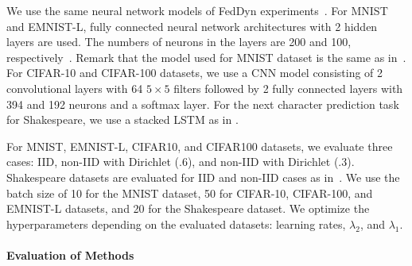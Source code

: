 \documentclass{article} %
\begin{document}
We use the same neural network models of FedDyn experiments~\citep{Acar2021federated}. For MNIST and EMNIST-L, fully connected neural network architectures with 2 hidden layers are used. The numbers of neurons in the layers are 200 and 100, respectively~\citep{Acar2021federated}. Remark that the model used for MNIST dataset is the same as in~\citet{Acar2021federated,McMahan2017communication}. For CIFAR-10 and CIFAR-100 datasets, we use a CNN model consisting of 2 convolutional layers with 64 $5 \times 5$ filters followed by 2 fully connected layers with 394 and 192 neurons and a softmax layer. For the next character prediction task for Shakespeare, we use a stacked LSTM as in \citet{Acar2021federated}. %

For MNIST, EMNIST-L, CIFAR10, and CIFAR100 datasets, we evaluate three cases: IID, non-IID with Dirichlet (.6), and non-IID with Dirichlet (.3). Shakespeare datasets are evaluated for IID and non-IID cases as in~\citet{Acar2021federated}. We use the batch size of 10 for the MNIST dataset, 50 for CIFAR-10, CIFAR-100, and EMNIST-L datasets, and 20 for the Shakespeare dataset. We optimize the hyperparameters depending on the evaluated datasets: learning rates, $\lambda_2$, and $\lambda_1$.

\paragraph{Evaluation of Methods}
\end{document}
